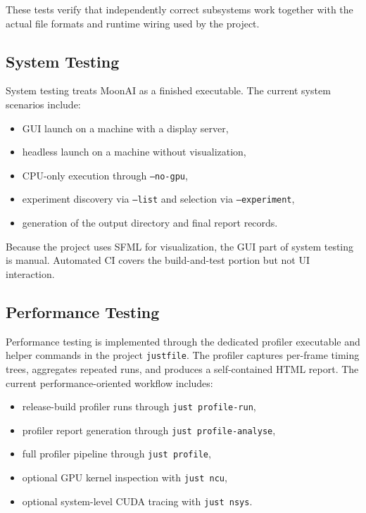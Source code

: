 These tests verify that independently correct subsystems work together with the actual file
formats and runtime wiring used by the project.

\subsection{System Testing}

System testing treats MoonAI as a finished executable. The current system scenarios include:

\begin{itemize}[nosep]
	\item GUI launch on a machine with a display server,
	\item headless launch on a machine without visualization,
	\item CPU-only execution through \texttt{--no-gpu},
	\item experiment discovery via \texttt{--list} and selection via \texttt{--experiment},
	\item generation of the output directory and final report records.
\end{itemize}

Because the project uses SFML for visualization, the GUI part of system testing is manual.
Automated CI covers the build-and-test portion but not UI interaction.

\subsection{Performance Testing}

Performance testing is implemented through the dedicated profiler executable and helper
commands in the project \texttt{justfile}. The profiler captures per-frame timing trees,
aggregates repeated runs, and produces a self-contained HTML report. The current
performance-oriented workflow includes:

\begin{itemize}[nosep]
	\item release-build profiler runs through \texttt{just profile-run},
	\item profiler report generation through \texttt{just profile-analyse},
	\item full profiler pipeline through \texttt{just profile},
	\item optional GPU kernel inspection with \texttt{just ncu},
	\item optional system-level CUDA tracing with \texttt{just nsys}.
\end{itemize}

